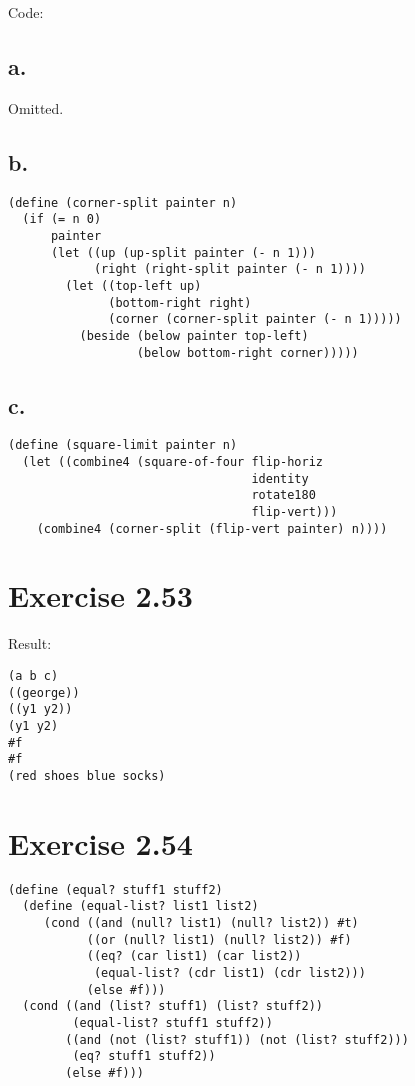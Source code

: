 \documentclass[../main.tex]{subfiles}
\begin{document}
Code:

\subsection{a.}

Omitted.

\subsection{b.}

\begin{lstlisting}
(define (corner-split painter n)
  (if (= n 0)
      painter
      (let ((up (up-split painter (- n 1)))
            (right (right-split painter (- n 1))))
        (let ((top-left up)
              (bottom-right right)
              (corner (corner-split painter (- n 1)))))
          (beside (below painter top-left)
                  (below bottom-right corner)))))
\end{lstlisting}

\subsection{c.}

\begin{lstlisting}
(define (square-limit painter n)
  (let ((combine4 (square-of-four flip-horiz
                                  identity
                                  rotate180
                                  flip-vert)))
    (combine4 (corner-split (flip-vert painter) n))))
\end{lstlisting}

\section{Exercise 2.53}

Result:

\begin{lstlisting}
(a b c)
((george))
((y1 y2))
(y1 y2)
#f
#f
(red shoes blue socks)
\end{lstlisting}

\section{Exercise 2.54}

\begin{lstlisting}
(define (equal? stuff1 stuff2)
  (define (equal-list? list1 list2)
     (cond ((and (null? list1) (null? list2)) #t)
           ((or (null? list1) (null? list2)) #f)
           ((eq? (car list1) (car list2))
            (equal-list? (cdr list1) (cdr list2)))
           (else #f)))
  (cond ((and (list? stuff1) (list? stuff2))
         (equal-list? stuff1 stuff2))
        ((and (not (list? stuff1)) (not (list? stuff2)))
         (eq? stuff1 stuff2))
        (else #f)))
\end{lstlisting}
\end{document}
